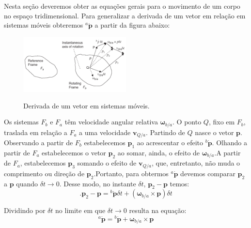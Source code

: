 Nesta seção deveremos obter as equações gerais para o movimento de um corpo no espaço tridimensional. Para generalizar a derivada de um vetor em relação em sistemas móveis obteremos \(^{a}\dot{\mathbf{p}}\) a partir da figura abaixo:
\begin{figure}[H]
    \centering
    \includegraphics[width=0.5\textwidth, keepaspectratio]{figuras/figure1.4-1.png}\label{fig1.4-1}
    \caption{Derivada de um vetor em sistemas móveis.}
\end{figure}

Os sistemas \(F_{b}\) e \(F_{a}\) têm velocidade angular relativa \(\mathbf{\omega}_{b/a}\). O ponto \(Q\), fixo em \(F_{b}\), traslada em relação a \(F_{a}\) a uma velocidade \(\mathbf{v}_{Q/a}\). Partindo de  \(Q\) nasce o vetor \(\mathbf{p}\). Observando a partir de \(F_{b}\) estabelecemos \(\mathbf{p}_{1}\) ao acrescentar o efeito \({^b\dot{\mathbf{p}}}\). Olhando a partir de \(F_{a}\) estabelecemos o vetor  \(\mathbf{p}_{2}\) ao somar, ainda, o efeito de \(\mathbf{\omega}_{b/a}\).A partir de \(F_{a}\), estabelecemos \(\mathbf{p}_{3}\) somando o efeito de \(\mathbf{v}_{Q/a}\), que, entretanto, não muda o comprimento ou direção de \(\mathbf{p}_{2}\).Portanto, para obtermos \(^{a}\dot{\mathbf{p}}\) devemos  comparar \(\mathbf{p}_{2}\) a \(\mathbf{p}\) quando \(\delta t \rightarrow 0\). Desse modo, no instante \(\delta t\), \(\mathbf{p}_{2} \!-\! \mathbf{p}\) temos:
\begin{equation*}.
    \mathbf{p}_{2} - \mathbf{p} = {^{b}\dot{\mathbf{p}}} \delta t + \left( \mathbf{\omega}_{b/a} \! \times \!\mathbf{p} \right) \delta t
\end{equation*}

Dividindo por \(\delta t\) no limite em que \(\delta t \rightarrow 0\) resulta na equação\footnotemark{}:
\begin{equation*} \tag{1.4-2}
    {^{a}\dot{\mathbf{p}}} = {^{b}\dot{\mathbf{p}}} + {\mathbf{\omega}_{b/a} \! \times \!\mathbf{p}}
\end{equation*}


